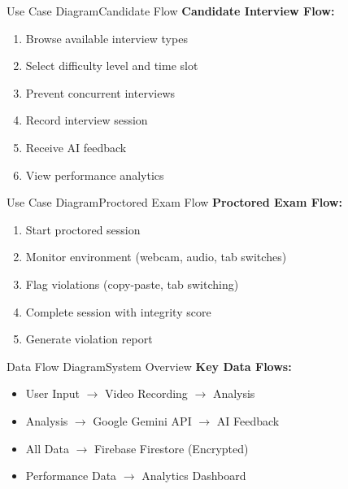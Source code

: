 \documentclass{beamer}
\begin{document}
\begin{frame}{Use Case Diagram}{Candidate Flow}
\textbf{Candidate Interview Flow:}
\begin{enumerate}
    \item Browse available interview types
    \item Select difficulty level and time slot
    \item Prevent concurrent interviews
    \item Record interview session
    \item Receive AI feedback
    \item View performance analytics
\end{enumerate}
\end{frame}

\begin{frame}{Use Case Diagram}{Proctored Exam Flow}
\textbf{Proctored Exam Flow:}
\begin{enumerate}
    \item Start proctored session
    \item Monitor environment (webcam, audio, tab switches)
    \item Flag violations (copy-paste, tab switching)
    \item Complete session with integrity score
    \item Generate violation report
\end{enumerate}
\end{frame}

\begin{frame}{Data Flow Diagram}{System Overview}
\textbf{Key Data Flows:}
\begin{itemize}
    \item User Input $\rightarrow$ Video Recording $\rightarrow$ Analysis
    \item Analysis $\rightarrow$ Google Gemini API $\rightarrow$ AI Feedback
    \item All Data $\rightarrow$ Firebase Firestore (Encrypted)
    \item Performance Data $\rightarrow$ Analytics Dashboard
\end{itemize}
\end{frame}

\end{document}

